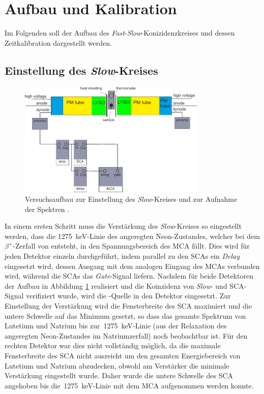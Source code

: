 \documentclass[11pt, a4paper]{article}
\numberwithin{equation}{section}
\begin{document}
\section{Aufbau und Kalibration}

Im Folgenden soll der Aufbau des \textit{Fast}-\textit{Slow}-Konizidenzkreises und dessen Zeitkalibration dargestellt werden.

\subsection{Einstellung des \textit{Slow}-Kreises}
\label{sec:slow_kreis}
\begin{figure}[h]
	\centering
	\includegraphics[width=0.8\textwidth]{./figures/aufbau/energie.pdf}
	\caption{Versuchsaufbau zur Einstellung des \textit{Slow}-Kreises und zur Aufnahme der Spektren \cite{anleitung}.}
	\label{fig:slow_kreis}
\end{figure}
In einem ersten Schritt muss die Verstärkung des \textit{Slow}-Kreises so eingestellt werden, dass die \SI{1275}{\keV}-Linie des angeregten Neon-Zustandes, welcher bei dem $\beta^+$-Zerfall von  entsteht, in den Spannungsbereich des MCA fällt.
Dies wird für jeden Detektor einzeln durchgeführt, indem parallel zu den SCAs ein \textit{Delay} eingesetzt wird, dessen Ausgang mit dem analogen Eingang des MCAs verbunden wird, während die SCAs das \textit{Gate}-Signal liefern.
Nachdem für beide Detektoren der Aufbau in Abbildung \ref{fig:slow_kreis} realisiert und die Koinzidenz von \textit{Slow}- und SCA-Signal verifiziert wurde, wird die -Quelle in den Detektor eingesetzt.
Zur Einstellung der Verstärkung wird die Fensterbreite des SCA maximiert und die untere Schwelle auf das Minimum gesetzt, so dass das gesamte Spektrum von Lutetium und Natrium bis zur~\SI{1275}{keV}-Linie (aus der Relaxation des angeregten Neon-Zustandes im Natriumzerfall) noch beobachtbar ist.
Für den rechten Detektor war dies nicht vollständig möglich, da die maximale Fensterbreite des SCA nicht ausreicht um den gesamten Energiebereich von Lutetium und Natrium abzudecken, obwohl am Verstärker die minimale Verstärkung eingestellt wurde.
Daher wurde die untere Schwelle des SCA angehoben bis die~\SI{1275}{keV}-Linie mit dem MCA aufgenommen werden konnte.
\end{document}
